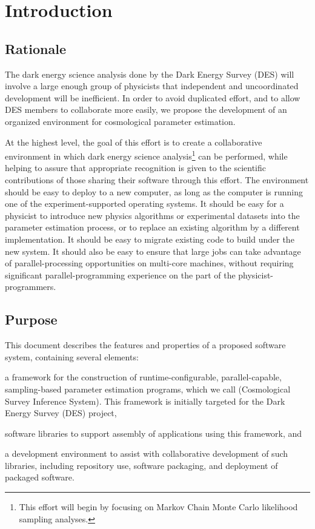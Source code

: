 \documentclass[draftmode,draftwater]{memarticle}
\newcommand{\cosmosis}{\name{CosmoSIS}\xspace}
\begin{document}
	
\topmatter %

\chapter{Introduction\label{ch:introduction}}

\section{Rationale\label{sec:rationale}}

The dark energy science analysis done by the Dark Energy Survey (DES) will involve a large enough
group of physicists that independent and uncoordinated development will
be inefficient. In order to avoid duplicated effort, and to allow DES
members to collaborate more easily, we propose the development of an
organized environment for cosmological parameter estimation.

At the highest level, the goal of this effort is to create a
collaborative environment in which dark energy science
analysis\footnote{This effort will begin by focusing on Markov Chain
  Monte Carlo likelihood sampling analyses.} can be performed, while
helping to assure that appropriate recognition is given to the
scientific contributions of those sharing their software through this effort.
The
environment should be easy to deploy to a new computer, as long as the
computer is running one of the experiment-supported operating systems.
It should be easy for a physicist to introduce new physics algorithms or experimental datasets
into the parameter estimation process, or to replace an existing
algorithm by a different implementation. It should be easy to migrate
existing code to build under the new system. It should also be easy to
ensure that large jobs can take advantage of parallel-processing
opportunities on multi-core machines, without requiring significant
parallel-programming experience on the part of the
physicist-programmers.

\section{Purpose\label{sec:purpose}}

This document describes the features and properties of a proposed
software system, containing several elements:
\begin{inparaenum}[(a)]
\item a framework for the construction of runtime-configurable,
  parallel-capable, sampling-based parameter estimation programs, which
  we call \cosmosis (Cosmological Survey Inference System). This
  framework is initially targeted for the Dark Energy Survey
  (DES)\cite{des} project,
\item software libraries to support assembly of applications using this
  framework, and
\item a development environment to assist with collaborative development
  of such libraries, including repository use, software packaging, and
  deployment of packaged software.
\end{inparaenum}
\end{document}
